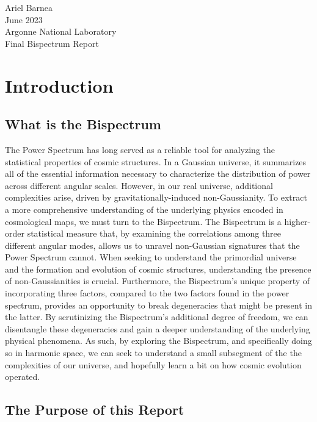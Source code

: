 \documentclass[11pt]{article}
\renewcommand{\_}[1]{\underline{ #1 }}
\newcommand{\npar}{\vspace{.3cm}\newline}
\newcommand{\head}[1]{
	\begin{center}
		{\large #1}
		\vspace{.2 in}
	\end{center}
}
\begin{document}
\head
{Ariel Barnea\\June 2023\\Argonne National Laboratory\\Final Bispectrum Report}

\hypersetup{linkcolor=black}
\renewcommand\contentsname{Table of Contents}
\tableofcontents
\newpage

\hypersetup{linkcolor=blue}

{\setlength{\parindent}{0cm}

\section{Introduction}\label{intro}

\subsection{What is the Bispectrum}

The Power Spectrum has long served as a reliable tool for analyzing the statistical properties of cosmic structures. In a Gaussian universe, it summarizes all of the essential information necessary to characterize the distribution of power across different angular scales. However, in our real universe, additional complexities arise, driven by gravitationally-induced non-Gaussianity. To extract a more comprehensive understanding of the underlying physics encoded in cosmological maps, we must turn to the Bispectrum.
\npar
The Bispectrum is a higher-order statistical measure that, by examining the correlations among three different angular modes, allows us to unravel non-Gaussian signatures that the Power Spectrum cannot. When seeking to understand the primordial universe and the formation and evolution of cosmic structures, understanding the presence of non-Gaussianities is crucial. Furthermore, the Bispectrum's unique property of incorporating three factors, compared to the two factors found in the power spectrum, provides an opportunity to break degeneracies that might be present in the latter. By scrutinizing the Bispectrum's additional degree of freedom, we can disentangle these degeneracies and gain a deeper understanding of the underlying physical phenomena.
\npar
As such, by exploring the Bispectrum, and specifically doing so in harmonic space, we can seek to understand a small subsegment of the the complexities of our universe, and hopefully learn a bit on how cosmic evolution operated.

\subsection{The Purpose of this Report}

}
\end{document}
